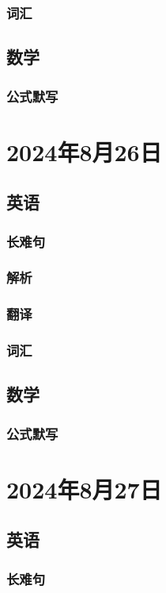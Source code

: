 \documentclass[UTF8]{ctexart}
\begin{document}
\subsubsection{词汇}
\subsection{数学}
\subsubsection{公式默写}
\begin{multicols}{2}
\end{multicols}
\section{2024年8月26日}
\subsection{英语}
\subsubsection{长难句}
\subsubsection{解析}
\subsubsection{翻译}
\subsubsection{词汇}
\subsection{数学}
\subsubsection{公式默写}
\begin{multicols}{2}
\end{multicols}
\section{2024年8月27日}
\subsection{英语}
\subsubsection{长难句}
\end{document}
